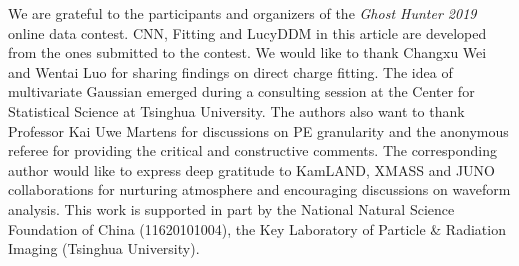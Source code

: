 \acknowledgments
We are grateful to the participants and organizers of the \textit{Ghost Hunter 2019} online data contest.  CNN, Fitting and LucyDDM in this article are developed from the ones submitted to the contest.  We would like to thank Changxu Wei and Wentai Luo for sharing findings on direct charge fitting.  The idea of multivariate Gaussian emerged during a consulting session at the Center for Statistical Science at Tsinghua University.  The authors also want to thank Professor Kai Uwe Martens for discussions on PE granularity and the anonymous referee for providing the critical and constructive comments.  The corresponding author would like to express deep gratitude to KamLAND, XMASS and JUNO collaborations for nurturing atmosphere and encouraging discussions on waveform analysis.  This work is supported in part by the National Natural Science Foundation of China (11620101004), the Key Laboratory of Particle \& Radiation Imaging (Tsinghua University). 


